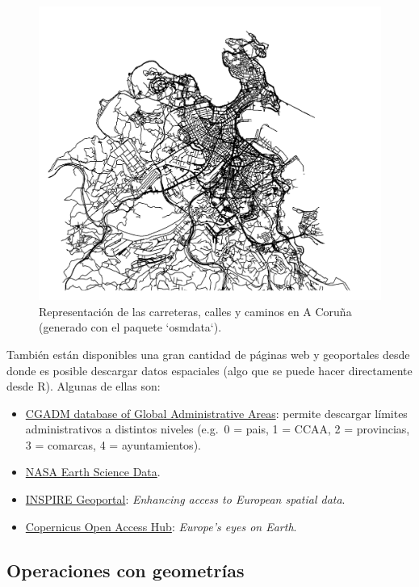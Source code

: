 \documentclass[
  spanish,
]{book}
\theoremstyle{break}
\begin{document}
\begin{figure}[!htb]

{\centering \includegraphics[width=0.7\linewidth]{images/osmdata-1} 

}

\caption{Representación de las carreteras, calles y caminos en A Coruña (generado con el paquete `osmdata`).}\label{fig:osmdata-plot}
\end{figure}

También están disponibles una gran cantidad de páginas web y geoportales desde donde es posible descargar datos espaciales (algo que se puede hacer directamente desde R).
Algunas de ellas son:

\begin{itemize}
\item
  \href{https://www.gadm.org}{CGADM database of Global Administrative Areas}: permite descargar límites administrativos a distintos niveles (e.g.~0 = pais, 1 = CCAA, 2 = provincias, 3 = comarcas, 4 = ayuntamientos).
\item
  \href{https://earthdata.nasa.gov}{NASA Earth Science Data}.
\item
  \href{https://inspire-geoportal.ec.europa.eu}{INSPIRE Geoportal}: \emph{Enhancing access to European spatial data}.
\item
  \href{https://scihub.copernicus.eu}{Copernicus Open Access Hub}: \emph{Europe's eyes on Earth}.
\end{itemize}

\hypertarget{operaciones-con-geometruxedas}{%
\subsection{Operaciones con geometrías}\label{operaciones-con-geometruxedas}}
\end{document}

